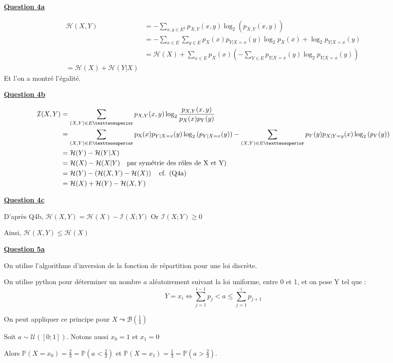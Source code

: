 \documentclass[a4paper,twoside,10pt]{article}
\renewcommand{\H}{\mathcal{H}}
\newcommand{\I}{\mathcal{I}}
\newcommand{\B}{\mathcal{B}}
\newenvironment{Q}[1]{%
\vspace{1ex}
\underline{\textbf{Question #1\\}}
\newline
}{
\vspace{2ex}
}
\begin{document}
\begin{Q}{4a}
\begin{align*}
\H(X,Y) &= - \sum_{x,y \in E^2}  p_{X,Y}(x,y)\log_2{(p_{X,Y}(x,y))} \\
	&= -\sum_{x \in E} \sum_{y \in E} p_X(x) p_{Y|X = x}(y) \log_2{p_X(x)}
		+ \log_2{p_{Y|X= x}(y)} \\
	&= \H(X) + \sum_{x \in E} p_X(x)
		\left(
			-\sum_{Y \in E} p_{Y|X = x}(y) \log_2{p_{Y|X = x}(y)}
		\right) \\
 = \H(X) + \H(Y|X)
\end{align*}
Et l'on a montré l'égalité.
\end{Q} 
 
\begin{Q}{4b}

\begin{align*}
\I(X,Y) &= \sum_{(X,Y) \in E²} p_{X,Y}(x,y)
				\log_2{\frac{p_{X,Y}{(x,y)}}{p_X(x)p_Y(y)}} \\
	&= \sum_{(X,Y) \in E²}
		\operatorname{p_X}(x) p_{Y|X=x}(y) \log_2{(p_{Y|X=x}(y))} 
 		- \sum_{(X,Y) \in E²}
 			p_Y(y) p_{X|Y=y}(x) \log_2{(p_{Y}(y))} \\
	&= \H(Y) - \H(Y|X) \\
	&= \H(X) - \H(X|Y) \text{\quad par symétrie des rôles de X et Y)} \\
	&= \H(Y) - \left(\H(X,Y) - \H(X)\right) \text{\quad cf. (Q4a)} \\
	&= \H(X) + \H(Y) - \H(X,Y)
\end{align*}
\end{Q}

\begin{Q}{4c}

D'après Q4b, $\H(X,Y) = \H(X) - \I(X;Y)$ Or $\I(X;Y) \geq 0$

Ainsi, $\H(X,Y) \leq \H(X)$
\end{Q}

\begin{Q}{5a}

On utilise l'algorithme d'inversion de la fonction de répartition pour une loi discrète.

On utilise python pour déterminer un nombre $a$ aléatoirement suivant la loi uniforme, entre 0 et 1, et on pose Y tel que : 
\[
Y = x_i  \iff \sum_{j = 1}^{i-1} p_j < a \leq \sum_{j = 1}^{i} p_{j+1}
\]

On peut appliquer ce principe pour $X \leadsto \B(\frac{1}{3})$

Soit $a \sim \mathcal{U}([0;1])$. Notons aussi $x_0 = 1$ et $x_1 = 0$

Alors $\mathbb{P}(X = x_0) = \frac{2}{3} = \mathbb{P}(a < \frac{2}{3})$ et 
$\mathbb{P}(X = x_1) = \frac{1}{3} = \mathbb{P}(a > \frac{2}{3})$.
\end{Q}
\end{document}
